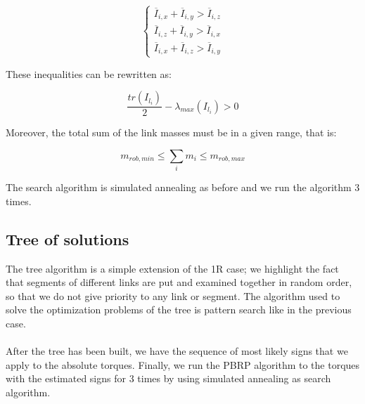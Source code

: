\documentclass{article}
\begin{document}
\[\begin{cases}
\overline{I}_{i,x}+\overline{I}_{i,y} > \overline{I}_{i,z} \\
\overline{I}_{i,z}+\overline{I}_{i,y} > \overline{I}_{i,x} \\
\overline{I}_{i,x}+\overline{I}_{i,z} > \overline{I}_{i,y}
\end{cases}\]

These inequalities can be rewritten as:

\[\frac{tr(I_{l_i})}{2}-\lambda_{max}(I_{l_i})>0\]

Moreover, the total sum of the link masses must be in a given range, that is:

\[m_{rob,min}\le \sum_i{m_i} \le m_{rob,max}\]

The search algorithm is simulated annealing as before and we run the algorithm 3 times.
\subsection{Tree of solutions}
The tree algorithm is a simple extension of the 1R case; we highlight the fact that segments of different links are put and examined together in random order, so that we do not give priority to any link or segment. The algorithm used to solve the optimization problems of the tree is pattern search like in the previous case.
\\\\
After the tree has been built, we have the sequence of most likely signs that we apply to the absolute torques. Finally, we run the PBRP algorithm to the torques with the estimated signs for 3 times by using simulated annealing as search algorithm.
\end{document}
